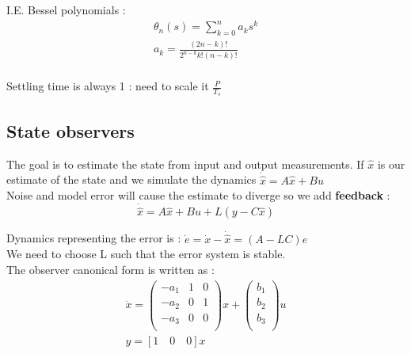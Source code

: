 \documentclass[../main.tex]{subfiles}
\begin{document}
I.E. Bessel polynomials : \begin{equation}
\begin{gathered}
    \theta_n(s) = \sum_{k=0}^n a_k s^k\\
    a_k = \frac{(2n-k)!}{2^{n-k}k! (n-k)!}\\
    \end{gathered}
\end{equation}

\warning Settling time is always 1 : need to scale it $\frac{P}{T_s}$\\

\subsection{State observers}

The goal is to estimate the state from input and output measurements. If $\hat{x}$ is our estimate of the state and we simulate the dynamics $\dot{\hat{x}} = A\hat{x} + Bu$\\
Noise and model error will cause the estimate to diverge so we add \textbf{feedback} : \begin{equation}
    \dot{\hat{x}} = A\hat{x} + Bu + L(y-C\hat{x})
\end{equation}

Dynamics representing the error is : $\dot{e} = \dot{x}-\dot{\hat{x}} = (A-LC)e$\\
We need to choose L such that the error system is stable. \\

The observer canonical form is written as : \begin{equation}
    \begin{gathered}
        \dot{x} = \begin{pmatrix}
            -a_1 & 1 & 0\\
            -a_2 & 0 & 1\\
            -a_3 & 0 & 0\\
        \end{pmatrix} x  + \begin{pmatrix}
            b_1\\ b_2 \\b_3\\
        \end{pmatrix}u\\
        y = [1 \quad 0 \quad 0]x\\
    \end{gathered}
\end{equation}
\end{document}
